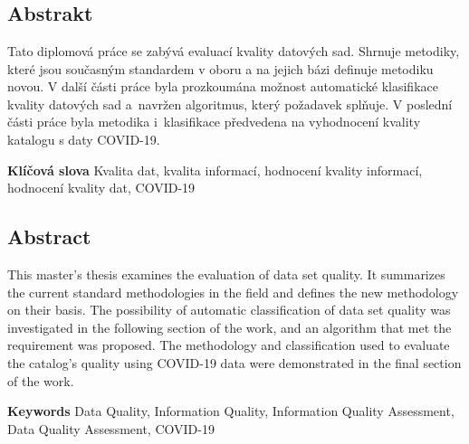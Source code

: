 \chapter*{}

\section*{Abstrakt}

Tato diplomová práce se zabývá evaluací kvality datových sad.
Shrnuje metodiky, které jsou současným standardem v oboru a na jejich bázi definuje metodiku novou.
V další části práce byla prozkoumána možnost automatické klasifikace kvality datových sad a~navržen algoritmus, který požadavek splňuje.
V poslední části práce byla metodika i~klasifikace předvedena na vyhodnocení kvality katalogu s daty COVID-19.

\vspace{5mm}

\textbf{Klíčová slova} Kvalita dat, kvalita informací, hodnocení kvality informací, hodnocení kvality dat, COVID-19

\vspace{20mm}

\section*{Abstract}

This master's thesis examines the evaluation of data set quality.
It summarizes the current standard methodologies in the field and defines the new methodology on their basis.
The possibility of automatic classification of data set quality was investigated in the following section of the work, and an algorithm that met the requirement was proposed.
The methodology and classification used to evaluate the catalog's quality using COVID-19 data were demonstrated in the final section of the work.

\vspace{5mm}

\textbf{Keywords} Data Quality, Information Quality, Information Quality Assessment, Data Quality Assessment, COVID-19
